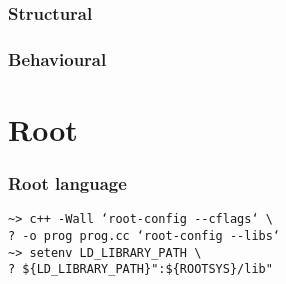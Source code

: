 \documentclass{article}
\begin{document}
\section{Structural}

\section{Behavioural}
























































\part{Root}
\section{Root language}
\begin{lstlisting}
~> c++ -Wall ‘root-config --cflags‘ \
? -o prog prog.cc ‘root-config --libs‘
~> setenv LD_LIBRARY_PATH \
? ${LD_LIBRARY_PATH}":${ROOTSYS}/lib"
\end{lstlisting}
\end{document}
